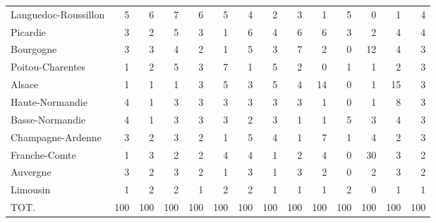 \documentclass[11pt]{article}
\begin{document}
\begin{table}[H]
\begin{tabular}{lrrrrrrrrrrrrr}
Languedoc-Roussillon &          5 &          6 &          7 &          6 &          5 &          4 &          2 &          3 &          1 &          5 &          0 &          1 &          4 \\
Picardie             &          3 &          2 &          5 &          3 &          1 &          6 &          4 &          6 &          6 &          3 &          2 &          4 &          4 \\
Bourgogne            &          3 &          3 &          4 &          2 &          1 &          5 &          3 &          7 &          2 &          0 &         12 &          4 &          3 \\
Poitou-Charentes     &          1 &          2 &          5 &          3 &          7 &          1 &          5 &          2 &          0 &          1 &          1 &          2 &          3 \\
Alsace               &          1 &          1 &          1 &          3 &          5 &          3 &          5 &          4 &         14 &          0 &          1 &         15 &          3 \\
Haute-Normandie      &          4 &          1 &          3 &          3 &          3 &          3 &          3 &          3 &          1 &          0 &          1 &          8 &          3 \\
Basse-Normandie      &          4 &          1 &          3 &          3 &          3 &          2 &          3 &          1 &          1 &          5 &          3 &          4 &          3 \\
Champagne-Ardenne    &          3 &          2 &          3 &          2 &          1 &          5 &          4 &          1 &          7 &          1 &          4 &          2 &          3 \\
Franche-Comte        &          1 &          3 &          2 &          2 &          4 &          4 &          1 &          2 &          4 &          0 &         30 &          3 &          2 \\
Auvergne             &          3 &          2 &          3 &          2 &          1 &          3 &          1 &          3 &          2 &          0 &          2 &          3 &          2 \\
Limousin             &          1 &          2 &          2 &          1 &          2 &          2 &          1 &          1 &          1 &          2 &          0 &          1 &          1 \\
TOT.                 &        100 &        100 &        100 &        100 &        100 &        100 &        100 &        100 &        100 &        100 &        100 &        100 &        100 \\
\bottomrule
\end{tabular}

\end{table}
\end{document}

